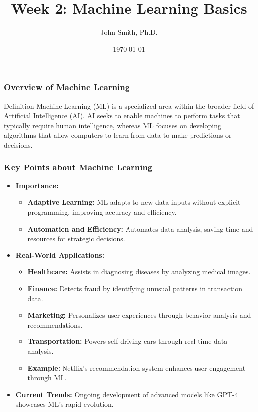 \documentclass[aspectratio=169]{beamer}
\title[Week 2: Machine Learning Basics]{Week 2: Machine Learning Basics}
\author[J. Smith]{John Smith, Ph.D.}
\institute[University Name]{
  Department of Computer Science\\
  University Name\\
  \vspace{0.3cm}
  Email: email@university.edu\\
  Website: www.university.edu
}
\date{\today}
\begin{document}
\frame{\titlepage}

\begin{frame}[fragile]
    \titlepage
\end{frame}

\begin{frame}[fragile]
    \frametitle{Overview of Machine Learning}
    \begin{block}{Definition}
        Machine Learning (ML) is a specialized area within the broader field of Artificial Intelligence (AI). 
        AI seeks to enable machines to perform tasks that typically require human intelligence, whereas ML focuses on developing algorithms that allow computers to learn from data to make predictions or decisions.
    \end{block}
\end{frame}

\begin{frame}[fragile]
    \frametitle{Key Points about Machine Learning}
    \begin{itemize}
        \item \textbf{Importance:}
            \begin{itemize}
                \item \textbf{Adaptive Learning:} ML adapts to new data inputs without explicit programming, improving accuracy and efficiency.
                \item \textbf{Automation and Efficiency:} Automates data analysis, saving time and resources for strategic decisions.
            \end{itemize}
        
        \item \textbf{Real-World Applications:}
            \begin{itemize}
                \item \textbf{Healthcare:} Assists in diagnosing diseases by analyzing medical images.
                \item \textbf{Finance:} Detects fraud by identifying unusual patterns in transaction data.
                \item \textbf{Marketing:} Personalizes user experiences through behavior analysis and recommendations.
                \item \textbf{Transportation:} Powers self-driving cars through real-time data analysis.
                \item \textbf{Example:} Netflix’s recommendation system enhances user engagement through ML.
            \end{itemize}
        
        \item \textbf{Current Trends:} 
            Ongoing development of advanced models like GPT-4 showcases ML's rapid evolution.
    \end{itemize}
\end{frame}
\end{document}
